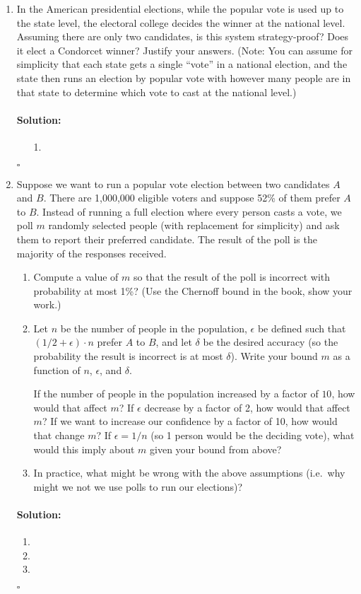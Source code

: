 \documentclass[11pt,letterpaper]{article}
\newif \iftemplate \templatetrue
\newenvironment{solution}{\paragraph{Solution:}}{\hfill$\square$}
\theoremstyle{definition}
\begin{document}
\begin{enumerate}
\item In the American presidential elections, while the popular vote is used up to the state level, the electoral college decides the winner at the national level. Assuming there are only two candidates, is this system strategy-proof? Does it elect a Condorcet winner? Justify your answers. (Note: You can assume for simplicity that each state gets a single ``vote'' in a national election, and the state then runs an election by popular vote with however many people are in that state to determine which vote to cast at the national level.)


\iftemplate
\begin{solution}
\begin{enumerate}
\item[1.]
\end{enumerate}
\end{solution}
\newpage
\fi

\item Suppose we want to run a popular vote election between two candidates $A$ and $B$.
There are 1,000,000 eligible voters and suppose 52\% of them prefer $A$ to $B$.
Instead of running a full election where every person casts a vote, we poll $m$ randomly selected people (with replacement for simplicity) and ask them to report their preferred candidate. The result of the poll is the majority of the responses received.
\begin{enumerate}
\item Compute a value of $m$ so that the result of the poll is incorrect with probability at most 1\%? (Use the Chernoff bound in the book, show your work.)
\item Let $n$ be the number of people in the population, $\epsilon$ be defined such that $(1/2 + \epsilon)\cdot n$ prefer $A$ to $B$, and let $\delta$ be the desired accuracy (so the probability the result is incorrect is at most $\delta$).
Write your bound $m$ as a function of $n$, $\epsilon$, and $\delta$.

If the number of people in the population increased by a factor of $10$, how would that affect $m$? If $\epsilon$ decrease by a factor of 2, how would that affect $m$? If we want to increase our confidence by a factor of 10, how would that change $m$? 
If $\epsilon = 1/n$ (so 1 person would be the deciding vote), what would this imply about $m$ given your bound from above?
\item In practice, what might be wrong with the above assumptions (i.e.\ why might we not we use polls to run our elections)?
\end{enumerate}
\iftemplate
\begin{solution}
\begin{enumerate}
\item
\item
\item
\end{enumerate}
\end{solution}
\newpage
\fi
\end{enumerate}
\end{document}
